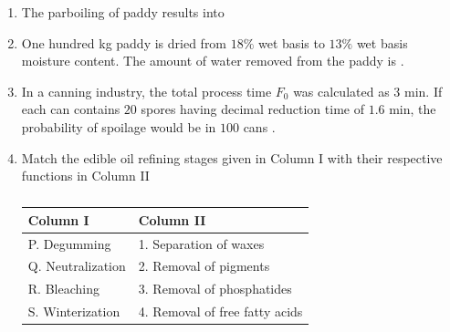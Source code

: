 \documentclass[journal,12pt,onecolumn]{IEEEtran}
\theoremstyle{remark}
\begin{document}
\begin{enumerate}
    \item The parboiling of paddy results into

    \hfill{}
    \begin{enumerate}
    \end{enumerate}

    \item One hundred kg paddy is dried from $18\%$ wet basis to $13\%$ wet basis moisture content. The amount of water removed  from the paddy is \underline{\hspace{2cm}} .

    \hfill{}

    \item In a canning industry, the total process time {$F_0$} was calculated as $3$ min. If each can contains $20$ spores having decimal reduction time of $1.6$ min, the probability of spoilage would be \underline{\hspace{2cm}} in $100$ cans .

    \hfill{}

    \item Match the edible oil refining stages given in Column I with their respective functions in Column II

    \hfill{}
    \begin{table}[h!]
    \centering
    \caption*{}
    \label{tab:q112}
    \begin{tabular}{ll}
    \hline
    \textbf{Column I} & \textbf{Column II} \\
    \hline
    P. Degumming & 1. Separation of waxes \\
    Q. Neutralization & 2. Removal of pigments \\
    R. Bleaching & 3. Removal of phosphatides \\
    S. Winterization & 4. Removal of free fatty acids \\
    \hline
    \end{tabular}
    \end{table}
    \begin{enumerate}
    \end{enumerate}


\end{enumerate}
\end{document}
